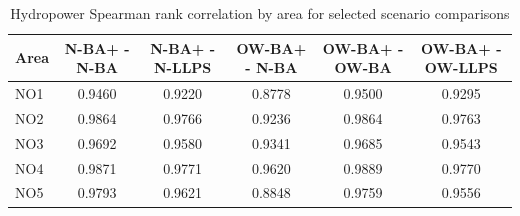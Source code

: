 \begin{table}[htbp]
\centering
\caption{Hydropower Spearman rank correlation by area for selected scenario comparisons}
\label{tab:spearman_area_pairs}
\begin{tabular}{lccccc}
\hline
Area & N-BA+ - N-BA & N-BA+ - N-LLPS & OW-BA+ - N-BA & OW-BA+ - OW-BA & OW-BA+ - OW-LLPS \\
\hline
NO1 & 0.9460 & 0.9220 & 0.8778 & 0.9500 & 0.9295 \\
NO2 & 0.9864 & 0.9766 & 0.9236 & 0.9864 & 0.9763 \\
NO3 & 0.9692 & 0.9580 & 0.9341 & 0.9685 & 0.9543 \\
NO4 & 0.9871 & 0.9771 & 0.9620 & 0.9889 & 0.9770 \\
NO5 & 0.9793 & 0.9621 & 0.8848 & 0.9759 & 0.9556 \\
\hline
\end{tabular}
\end{table}